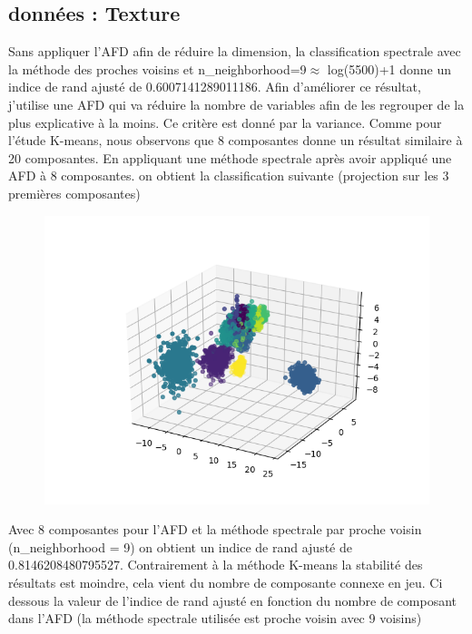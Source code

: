 \documentclass[12pt]{scrartcl} %
\begin{document}
\subsection{données : Texture}
Sans appliquer l'AFD afin de réduire la dimension, la classification spectrale avec la méthode des proches voisins et n\_neighborhood=9$\approx$ log(5500)+1 donne un indice de rand ajusté de 0.6007141289011186. Afin d'améliorer ce résultat, j'utilise une AFD qui va réduire la nombre de variables afin de les regrouper de la plus explicative à la moins. Ce critère est donné par la variance. Comme pour l'étude K-means, nous observons que 8 composantes donne un résultat similaire à 20 composantes. En appliquant une méthode spectrale après avoir appliqué une AFD à 8 composantes. on obtient la classification suivante (projection sur les 3 premières composantes)
\newline
\begin{figure}[!h]
 \centering 
\includegraphics[scale=.5]{spectraleAFD.png}
\end{figure}
\newline 
Avec 8 composantes pour l'AFD et la méthode spectrale par proche voisin (n\_neighborhood = 9) on obtient un indice de rand ajusté de 0.8146208480795527. Contrairement à la méthode K-means la stabilité des résultats est moindre, cela vient du nombre de composante connexe en jeu. Ci dessous la valeur de l'indice de rand ajusté en fonction du nombre de composant dans l'AFD (la méthode spectrale utilisée est proche voisin avec 9 voisins)
\newline
\end{document}
